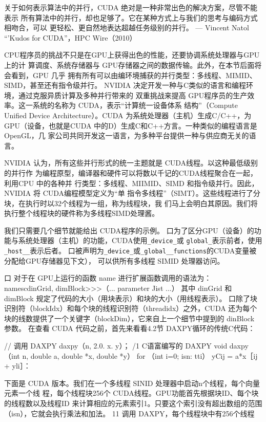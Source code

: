 关于如何表示算法中的并行，CUDA 绝对是一种非常出色的解决方案，尽管不能表示
所有算法中的并行，却也足够了。它在某种方式上与我们的思考与编码方式相吻合，可以
更轻松、更自然地表达超越任务级别的并行。
— Vincent Natol
“'Kudos for CUDA”，HPC Wire（2010）

CPU程序员的挑战不只是在GPU上获得出色的性能，还要协调系统处理器与GPU上的计
算调度、系统存储器与 GPU存储器之间的数据传输。此外，在本节后面将会看到，GPU 几乎
拥有所有可以由编环境捕获的并行类型：多线程、MIMID、SIMD，甚至还有指令级并行。
NVIDIA 决定开发一种与C类似的语言和编程环境，通过克服异质计算及多种并行带来的
双重挑战来提高 GPU程序员的生产效率。这一系统的名称为 CUDA，表示“计算统一设备体系
结构”（Compute Unified Device Architecture）。CUDA 为系统处理器（主机）生成C/C++，为
GPU（设备，也就是CUDA 中的D）生成C和C++方言。一种类似的编程语言是OpenGL，几
家公司共同开发这一语言，为多种平台提供一种与供应商无关的语言。

NVIDIA 认为，所有这些并行形式的统一主题就是 CUDA线程。以这种最低级别的并行作
为编程原型，编译器和硬件可以将数以千记的CUDA线程聚合在一起，利用CPU 中的各种并
行类型：多线程、MIIMID、SIMD 和指令级并行。因此，NVIDIA 将 CUDA编程模型定义为“单
指令多线程”（SIMT）。这些线程进行了分块，在执行时以32个线程为一组，称为线程块，我
们马上会明白其原因。我们将执行整个线程块的硬件称为多线程SIMD处理酱。

我们只需要几个细节就能给出 CUDA程序的示例。
口为了区分GPU（设备）的功能与系统处理器（主机）的功能，CUDA使用\verb|_device_|或
\verb|global_|表示前者，使用\verb|_host__|表示后者。
口被声明为\verb|_device_|或\verb|_global__functions|的CUDA变量被分配给GPU存储器见下文），
可以供所有多线程 SIMID 处理器访问。

口 对于在 GPU上运行的函数 name 进行扩展函数调用的语法为：
namescdinGrid, dimBlock>>>（... parameter Jist ...）
其中 dinGrid 和 dimBlock 规定了代码的大小（用块表示）和块的大小（用线程表示）。
口除了块识别符（blockIdx）和每个块的线程识别符（threadidx）之外，CUDA 还为每个
块的线数提供了一个关键字（blockDim），它来自上一个细节中提到的 dinBlock 参数。
在查看 CUDA 代码之前，首先来看看4.2节 DAXPY循环的传统C代码：

// 调用 DAXPY
daxpy（n, 2.0. x. y）；
/1 C语富编写的 DAXPY
void daxpy（int n, double a, double *x, double *y）
for （int i=0; isn: tti）
yCij = a*x［ij + yli］：

下面是 CUDA 版本。我们在一个多线程 SINID 处理器中启动n个线程，每个向量元素一个线
程，每个线程块256个 CUDA线程。GPU功能首先根据块ID、每个块的线程数以及线程ID
来计算相应的元素索引1。只要这个索引没有超出数组的范围（isn），它就会执行乘法和加法。
11 调用 DAXPY，每个线程块中有256个线程

